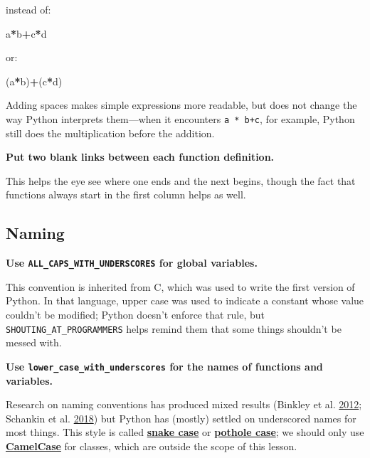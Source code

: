 \documentclass[
]{krantz}
\makeatletter
\newenvironment{Shaded}{\begin{snugshade}}{\end{snugshade}}
\newcommand{\NormalTok}[1]{#1}
\newcommand{\OperatorTok}[1]{\textcolor[rgb]{0.81,0.36,0.00}{\textbf{#1}}}
\newenvironment{kframe}{%
\medskip{}
\setlength{\fboxsep}{.8em}
 \def\at@end@of@kframe{}%
 \ifinner\ifhmode%
  \def\at@end@of@kframe{\end{minipage}}%
  \begin{minipage}{\columnwidth}%
 \fi\fi%
 \def\FrameCommand##1{\hskip\@totalleftmargin \hskip-\fboxsep
 \colorbox{shadecolor}{##1}\hskip-\fboxsep
     \hskip-\linewidth \hskip-\@totalleftmargin \hskip\columnwidth}%
 \MakeFramed {\advance\hsize-\width
   \@totalleftmargin\z@ \linewidth\hsize
   \@setminipage}}%
 {\par\unskip\endMakeFramed%
 \at@end@of@kframe}
\renewenvironment{Shaded}{\begin{kframe}}{\end{kframe}}
\newcommand{\gref}[2]{\hyperlink{#2}{\textbf{#1}}}
\makeatother
\begin{document}
instead of:

\begin{Shaded}
\begin{Highlighting}[]
\NormalTok{a}\OperatorTok{*}\NormalTok{b}\OperatorTok{+}\NormalTok{c}\OperatorTok{*}\NormalTok{d}
\end{Highlighting}
\end{Shaded}

or:

\begin{Shaded}
\begin{Highlighting}[]
\NormalTok{(a}\OperatorTok{*}\NormalTok{b)}\OperatorTok{+}\NormalTok{(c}\OperatorTok{*}\NormalTok{d)}
\end{Highlighting}
\end{Shaded}

Adding spaces makes simple expressions more readable,
but does not change the way Python interprets them---when it encounters \texttt{a~*~b+c},
for example,
Python still does the multiplication before the addition.

\textbf{Put two blank links between each function definition.}

This helps the eye see where one ends and the next begins,
though the fact that functions always start in the first column helps as well.

\hypertarget{naming}{%
\subsection{Naming}\label{naming}}

\textbf{Use \texttt{ALL\_CAPS\_WITH\_UNDERSCORES} for global variables.}

This convention is inherited from C,
which was used to write the first version of Python.
In that language,
upper case was used to indicate a constant whose value couldn't be modified;
Python doesn't enforce that rule,
but \texttt{SHOUTING\_AT\_PROGRAMMERS} helps remind them that
some things shouldn't be messed with.

\textbf{Use \texttt{lower\_case\_with\_underscores} for the names of functions and variables.}

Research on naming conventions has produced mixed results (Binkley et al. \protect\hyperlink{ref-Bink2012}{2012}; Schankin et al. \protect\hyperlink{ref-Scha2018}{2018})
but Python has (mostly) settled on underscored names for most things.
This style is called \gref{snake case}{snake\_case} or \gref{pothole case}{pothole\_case};
we should only use \gref{CamelCase}{camel\_case} for classes,
which are outside the scope of this lesson.
\end{document}
